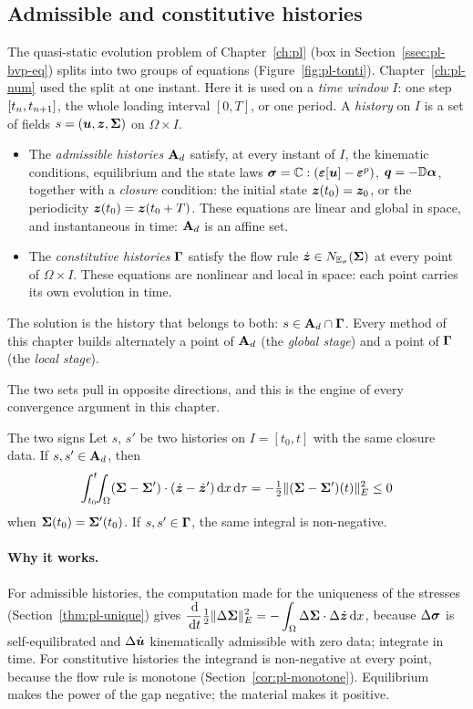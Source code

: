 \subsection{Admissible and constitutive histories}
The quasi-static evolution problem of Chapter~\ref{ch:pl} (box in
Section~\ref{ssec:pl-bvp-eq}) splits into two groups of equations
(Figure~\ref{fig:pl-tonti}). Chapter~\ref{ch:pl-num} used the split at one
instant. Here it is used on a \emph{time window} $I$: one step $[t_n,t_{n+1}]$,
the whole loading interval $[0,T]$, or one period. A \emph{history} on $I$ is
a set of fields $s=(\bm{u},\bm{z},\bm{\Sigma})$ on $\Omega\times I$.
\begin{itemize}
  \item The \emph{admissible histories} $\mathbf{A}_{d}$ satisfy, at every instant of $I$,
  the kinematic conditions, equilibrium and the state laws
  $\bm{\sigma}=\mathbb{C}:(\bm{\varepsilon}[\bm{u}]-\bm{\varepsilon}^{p})$, $\bm{q}=-\mathbb{D}\bm{\alpha}$, together with a
  \emph{closure} condition: the initial state $\bm{z}(t_0)=\bm{z}_0$, or the
  periodicity $\bm{z}(t_0)=\bm{z}(t_0+T)$. These equations are linear and global in
  space, and instantaneous in time: $\mathbf{A}_{d}$ is an affine set.
  \item The \emph{constitutive histories} $\boldsymbol{\Gamma}$ satisfy the flow rule
  $\dot{\bm{z}}\in N_{\mathbb{E}_{\sigma}}(\bm{\Sigma})$ at every point of $\Omega\times I$. These
  equations are nonlinear and local in space: each point carries its own
  evolution in time.
\end{itemize}
The solution is the history that belongs to both: $s\in\mathbf{A}_{d}\cap\boldsymbol{\Gamma}$. Every
method of this chapter builds alternately a point of $\mathbf{A}_{d}$ (the \emph{global
stage}) and a point of $\boldsymbol{\Gamma}$ (the \emph{local stage}).

The two sets pull in opposite directions, and this is the engine of every
convergence argument in this chapter.
\begin{gbox}{The two signs}\label{prop:cy-signs}
Let $s$, $s'$ be two histories on $I=[t_0,t]$ with the same closure data. If
$s,s'\in\mathbf{A}_{d}$, then
\[
  \int_{t_0}^{t}\!\!\int_\Omega(\bm{\Sigma}-\bm{\Sigma}')\cdot(\dot{\bm{z}}-\dot{\bm{z}}')\,\mathrm{d} x\,\mathrm{d}\tau
  =-\tfrac12\lVert (\bm{\Sigma}-\bm{\Sigma}')(t)\rVert_E^2\le0
\]
when $\bm{\Sigma}(t_0)=\bm{\Sigma}'(t_0)$. If $s,s'\in\boldsymbol{\Gamma}$, the same integral is
non-negative.
\end{gbox}
\paragraph{Why it works.} For admissible histories, the computation made for
the uniqueness of the stresses (Section~\ref{thm:pl-unique}) gives
$\displaystyle \frac{\,\mathrm{d}}{\,\mathrm{d} t}\tfrac12\lVert \Delta\bm{\Sigma}\rVert_E^2=-\int_\Omega\Delta\bm{\Sigma}\cdot\Delta\dot{\bm{z}}\,\mathrm{d} x$,
because $\Delta\bm{\sigma}$ is self-equilibrated and $\Delta\dot{\bm{u}}$ kinematically
admissible with zero data; integrate in time. For constitutive histories the
integrand is non-negative at every point, because the flow rule is monotone
(Section~\ref{cor:pl-monotone}). Equilibrium makes the power of the gap
negative; the material makes it positive.

